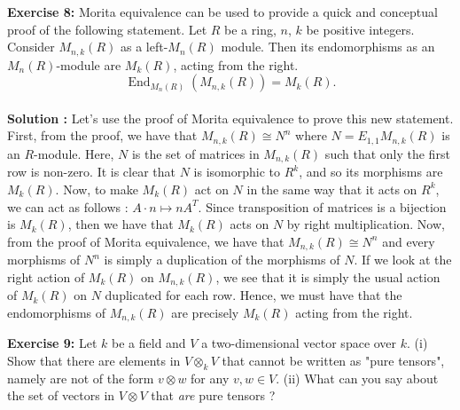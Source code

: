 \documentclass{article}
\DeclareMathOperator{\End}{End}
\newcommand{\isomorphic}{\cong}
\begin{document}
\newpage

\noindent \textbf{Exercise 8:} Morita equivalence can be used to provide a quick and conceptual proof of the following statement. Let $R$ be a ring, $n$, $k$ be positive integers. Consider $M_{n,k}(R)$ as a left-$M_n(R)$ module. Then its endomorphisms as an $M_n(R)$-module are $M_k(R)$, acting from the right.
$$\End_{M_n(R)}(M_{n,k}(R)) = M_k(R).$$ \\

\noindent \textbf{Solution :} Let's use the proof of Morita equivalence to prove this new statement. First, from the proof, we have that $M_{n,k}(R) \isomorphic N^n$ where $N = E_{1,1}M_{n,k}(R)$ is an $R$-module. Here, $N$ is the set of matrices in $M_{n,k}(R)$ such that only the first row is non-zero. It is clear that $N$ is isomorphic to $R^k$, and so its morphisms are $M_k(R)$. Now, to make $M_k(R)$ act on $N$ in the same way that it acts on $R^k$, we can act as follows : $A \cdot n \mapsto n A^T$. Since transposition of matrices is a bijection is $M_k(R)$, then we have that $M_k(R)$ acts on $N$ by right multiplication. Now, from the proof of Morita equivalence, we have that $M_{n,k}(R) \isomorphic N^n$ and every morphisms of $N^n$ is simply a duplication of the morphisms of $N$. If we look at the right action of $M_k(R)$ on $M_{n,k}(R)$, we see that it is simply the usual action of $M_k(R)$ on $N$ duplicated for each row. Hence, we must have that the endomorphisms of $M_{n,k}(R)$ are precisely $M_k(R)$ acting from the right.

\newpage

\noindent \textbf{Exercise 9:} Let $k$ be a field and $V$ a two-dimensional vector space over $k$. (i) Show that there are elements in $V \otimes_k V$ that cannot be written as "pure tensors", namely are not of the form $v \otimes w$ for any $v,w \in V$. (ii) What can you say about the set of vectors in $V \otimes V$ that \textit{are} pure tensors ? \\
\end{document}
